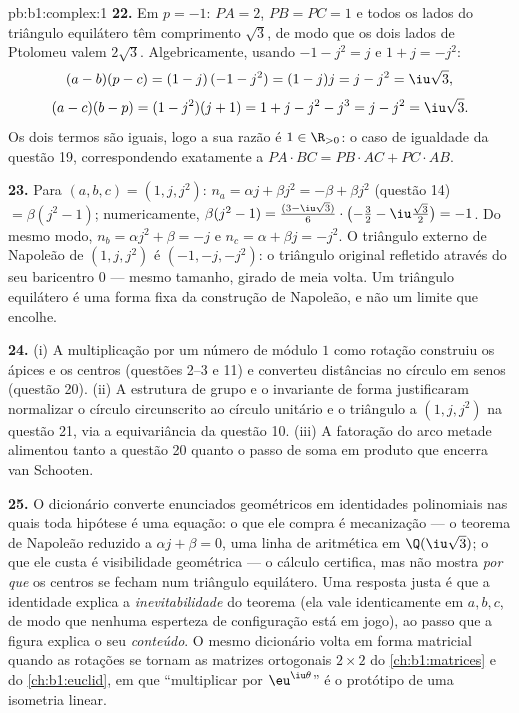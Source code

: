 \begin{solution}{pb:b1:complex:1}
\textbf{22.} Em $p = -1$: $PA = 2$, $PB = PC = 1$ e todos os lados do
triângulo equilátero têm comprimento $\sqrt3$, de modo que os dois lados
de Ptolomeu valem $2\sqrt3$. Algebricamente, usando $-1 - j^2 = j$ e
$1 + j = -j^2$:
\[
(a - b)(p - c) = (1 - j)\,(-1 - j^2) = (1 - j)j = j - j^2
= \iu\sqrt3 ,
\]
\[
(a - c)(b - p) = (1 - j^2)(j + 1) = 1 + j - j^2 - j^3
= j - j^2 = \iu\sqrt3 .
\]
Os dois termos são iguais, logo a sua razão é
$1 \in \R_{>0}$: o caso de igualdade da questão 19, correspondendo
exatamente a $PA
\cdot BC = PB \cdot AC + PC \cdot AB$.

\textbf{23.} Para $(a, b, c) = (1, j, j^2)$: $n_a = \alpha j +
\beta j^2 = -\beta + \beta j^2$ (questão 14) $= \beta(j^2 - 1)$;
numericamente, $\beta(j^2 - 1) = \frac{(3 - \iu\sqrt3)}6 \cdot
\bigl(-\frac32 - \iu\frac{\sqrt3}2\bigr) = -1$. Do mesmo modo, $n_b =
\alpha j^2 + \beta = -j$ e $n_c = \alpha + \beta j = -j^2$. O
triângulo externo de Napoleão de $(1, j, j^2)$ é $(-1, -j, -j^2)$: o
triângulo original refletido através do seu baricentro $0$ --- mesmo
tamanho, girado de meia volta. Um triângulo equilátero é uma forma fixa
da construção de Napoleão, e não um limite que encolhe.

\textbf{24.} (i) A multiplicação por um número de módulo $1$ como
rotação construiu os ápices e os centros (questões 2--3 e 11) e converteu
distâncias no círculo em senos (questão 20). (ii) A estrutura de
grupo e o invariante de forma justificaram normalizar o
círculo circunscrito ao círculo unitário e o triângulo a $(1, j, j^2)$
na questão 21, via a equivariância da questão 10. (iii) A
fatoração do arco metade alimentou tanto a questão 20 quanto o
passo de soma em produto que encerra van Schooten.

\textbf{25.} O dicionário converte enunciados geométricos em
identidades polinomiais nas quais toda hipótese é uma equação:
o que ele compra é mecanização --- o teorema de Napoleão reduzido a
$\alpha j + \beta = 0$, uma linha de aritmética em
$\Q(\iu\sqrt3)$; o que ele custa é visibilidade geométrica --- o
cálculo certifica, mas não mostra \emph{por que} os centros
se fecham num triângulo equilátero. Uma resposta justa é que a
identidade explica a \emph{inevitabilidade} do teorema (ela vale
identicamente em $a, b, c$, de modo que nenhuma esperteza de
configuração está em jogo), ao passo que a figura explica o seu
\emph{conteúdo}. O mesmo dicionário volta em forma matricial quando as
rotações se tornam as matrizes ortogonais $2 \times 2$ do \cref{ch:b1:matrices} e
do \cref{ch:b1:euclid}, em que ``multiplicar por
$\eu^{\iu\theta}$'' é o protótipo de uma isometria linear.
\end{solution}
